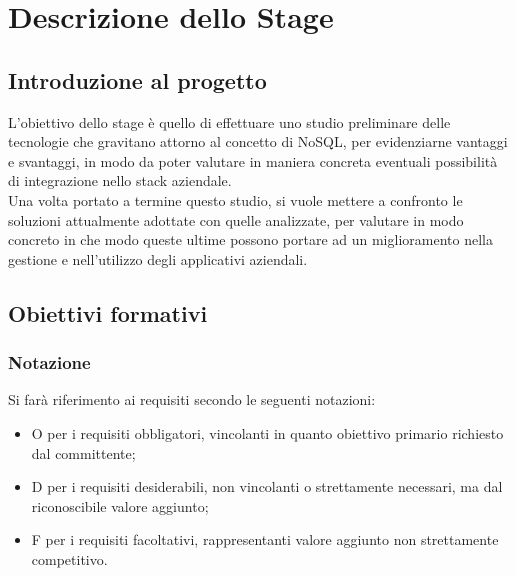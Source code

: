 
\chapter{Descrizione dello Stage}
\label{cap:descrizione-stage}


\section{Introduzione al progetto}

L'obiettivo dello stage è quello di effettuare uno studio preliminare delle tecnologie che gravitano attorno al concetto di NoSQL, per evidenziarne vantaggi e svantaggi, in modo da poter valutare in maniera concreta eventuali possibilità di integrazione nello stack aziendale. \\
Una volta portato a termine questo studio, si vuole mettere a confronto le soluzioni attualmente adottate con quelle analizzate, per valutare in modo concreto in che modo queste ultime possono portare ad un miglioramento nella gestione e nell'utilizzo degli applicativi aziendali.

\section{Obiettivi formativi}

\subsection{Notazione}
Si farà riferimento ai requisiti secondo le seguenti notazioni:
\begin{itemize}
    \item O per i requisiti obbligatori, vincolanti in quanto obiettivo primario richiesto dal committente;
    \item D per i requisiti desiderabili, non vincolanti o strettamente necessari, ma dal riconoscibile valore aggiunto;
    \item F per i requisiti facoltativi, rappresentanti valore aggiunto non strettamente competitivo.
\end{itemize}

